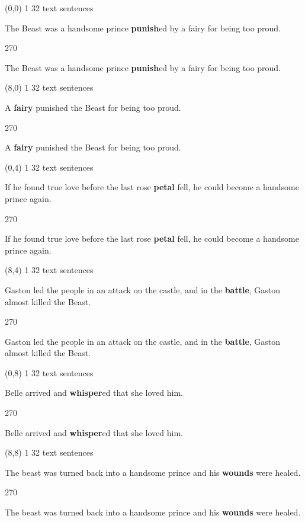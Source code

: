\documentclass[a4paper]{article}
\newenvironment{itemize*}%
{\begin{itemize}%
 \setlength{\itemsep}{0.5cm}%
 \setlength{\parsep}{0pt}%
 \setlength{\parskip}{0pt}}%
{\end{itemize}}
\newcommand{\mycard}[3]{%
	\small #1 #2
	\par
	\parbox[t][6.8cm][c]{9.5cm}{%
	\par
	\myleft{#3}
	\par
	\myright{#3}
	}
}
\newcommand{\myleft}[1]{%
	\begin{sideways}
	\hspace*{-0.9cm}
		\parbox[t][2.7cm][t]{6.5cm}{%
		\large #1
		}
	\end{sideways}
}
\newcommand{\myright}[1]{%
	\hspace*{6.5cm}
	\begin{turn}{270}
	\hspace*{-7.1cm}
		\parbox[t][2.7cm][t]{6.5cm}{%
		\large #1
		}
	\end{turn}
}
\begin{document}
\null
\newpage

\begin{textblock}{8}(0,0)
\mycard{1}{32 text sentences}{
\begin{itemize*}
\item The Beast was a handsome prince \textbf{punish}ed by a fairy for being too proud.
\end{itemize*}
}
\end{textblock}

\begin{textblock}{8}(8,0)
\mycard{1}{32 text sentences}{
\begin{itemize*}
\item A \textbf{fairy} punished the Beast for being too proud.
\end{itemize*}
}
\end{textblock}

\begin{textblock}{8}(0,4)
\mycard{1}{32 text sentences}{
\begin{itemize*}
\item If he found true love before the last rose \textbf{petal} fell, he could become a handsome prince again.
\end{itemize*}
}
\end{textblock}

\begin{textblock}{8}(8,4)
\mycard{1}{32 text sentences}{
\begin{itemize*}
\item Gaston led the people in an attack on the castle, and in the \textbf{battle}, Gaston almost killed the Beast.
\end{itemize*}
}
\end{textblock}

\begin{textblock}{8}(0,8)
\mycard{1}{32 text sentences}{
\begin{itemize*}
\item Belle arrived and \textbf{whisper}ed that she loved him.
\end{itemize*}
}
\end{textblock}

\begin{textblock}{8}(8,8)
\mycard{1}{32 text sentences}{
\begin{itemize*}
\item The beast was turned back into a handsome prince and his \textbf{wounds} were healed.
\end{itemize*}
}
\end{textblock}
\end{document}
